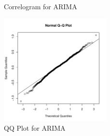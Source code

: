 \documentclass[10pt, a4paper]{article} %
\begin{document}
\begin{figure}[ht]
\begin{center}
\qquad
{}
\qquad
{}
\end{center}
\caption{Correlogram for ARIMA}
\label{corarima}
\end{figure}



\begin{figure}[H]
\begin{center}
\includegraphics[width=0.5\textwidth]{FINAL_VERSION-qqarima.pdf}
\caption{QQ Plot for ARIMA}
\label{qqarima}
\end{center}
\end{figure}
\end{document}

